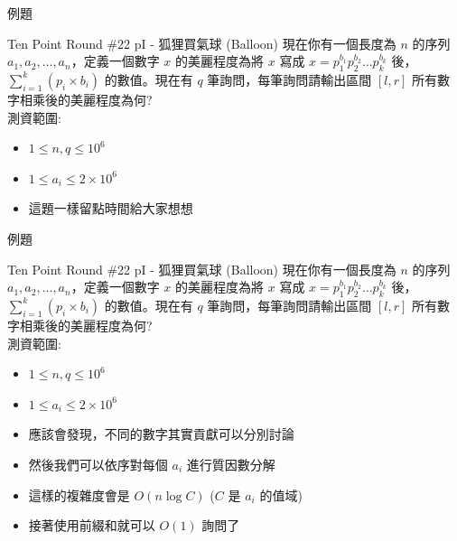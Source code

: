\documentclass[aspectratio=169]{beamer}
\begin{document}
\begin{frame}{例題}
    \begin{block}{Ten Point Round \#22 pI - 狐狸買氣球 (Balloon)}
        現在你有一個長度為 $n$ 的序列 $a_1, a_2, \dots, a_n$，定義一個數字 $x$ 的美麗程度為將 $x$ 寫成 $x = p_1^{b_1} p_2^{b_2} \ldots p_k^{b_k}$ 後，$\sum\limits_{i=1}^k (p_i \times b_i)$ 的數值。現在有 $q$ 筆詢問，每筆詢問請輸出區間 $[l,r]$ 所有數字相乘後的美麗程度為何? \\
        \vspace{5mm}
        測資範圍: 
        \begin{itemize}
            \item $1 \le n,q \le 10^6$
            \item $1 \le a_i \le 2 \times 10^6$
        \end{itemize}
    \end{block}
    \begin{itemize}
        \item<1-> 這題一樣留點時間給大家想想
    \end{itemize}
\end{frame}

\begin{frame}{例題}
    \begin{block}{Ten Point Round \#22 pI - 狐狸買氣球 (Balloon)}
        現在你有一個長度為 $n$ 的序列 $a_1, a_2, \dots, a_n$，定義一個數字 $x$ 的美麗程度為將 $x$ 寫成 $x = p_1^{b_1} p_2^{b_2} \ldots p_k^{b_k}$ 後，$\sum\limits_{i=1}^k (p_i \times b_i)$ 的數值。現在有 $q$ 筆詢問，每筆詢問請輸出區間 $[l,r]$ 所有數字相乘後的美麗程度為何? \\
        \vspace{5mm}
        測資範圍: 
        \begin{itemize}
            \item $1 \le n,q \le 10^6$
            \item $1 \le a_i \le 2 \times 10^6$
        \end{itemize}
    \end{block}
    \begin{itemize}
        \item 應該會發現，不同的數字其實貢獻可以分別討論
        \item 然後我們可以依序對每個 $a_i$ 進行質因數分解
        \item 這樣的複雜度會是 $O(n \log C)$ ($C$ 是 $a_i$ 的值域)
        \item 接著使用前綴和就可以 $O(1)$ 詢問了
    \end{itemize}
\end{frame}
\end{document}
